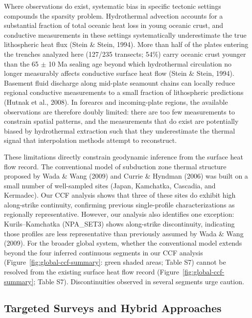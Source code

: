 \documentclass[draft,linenumbers]{agujournal2019}
\begin{document}
Where observations do exist, systematic bias in specific tectonic
settings compounds the sparsity problem. Hydrothermal advection accounts
for a substantial fraction of total oceanic heat loss in young oceanic
crust, and conductive measurements in these settings systematically
underestimate the true lithospheric heat flux (Stein \& Stein, 1994).
More than half of the plates entering the trenches analyzed here
(127/235 transects; 54\%) carry oceanic crust younger than the 65
\(\pm\) 10 Ma sealing age beyond which hydrothermal circulation no
longer measurably affects conductive surface heat flow (Stein \& Stein,
1994). Basement fluid discharge along mid-plate seamount chains can
locally reduce regional conductive measurements to a small fraction of
lithospheric predictions (Hutnak et al., 2008). In forearcs and
incoming-plate regions, the available observations are therefore doubly
limited: there are too few measurements to constrain spatial patterns,
and the measurements that do exist are potentially biased by
hydrothermal extraction such that they underestimate the thermal signal
that interpolation methods attempt to reconstruct.

These limitations directly constrain geodynamic inference from the
surface heat flow record. The conventional model of subduction zone
thermal structure proposed by Wada \& Wang (2009) and Currie \& Hyndman
(2006) was built on a small number of well-sampled sites (Japan,
Kamchatka, Cascadia, and Kermadec). Our CCF analysis shows that three of
these sites do exhibit high along-strike continuity, confirming previous
single-profile characterizations as regionally representative. However,
our analysis also identifies one exception: Kurils--Kamchatka
(NPA\_SET3) shows along-strike discontinuity, indicating those profiles
are less representative than previously assumed by Wada \& Wang (2009).
For the broader global system, whether the conventional model extends
beyond the four inferred continuous segments in our CCF analysis
(Figure~\ref{fig:global-ccf-summary}: green shaded areas; Table S7)
cannot be resolved from the existing surface heat flow record
(Figure~\ref{fig:global-ccf-summary}; Table S7). Discontinuities
observed in several segments urge caution.

\subsection{Targeted Surveys and Hybrid
Approaches}\label{sec:targeted-surveys-and-hybrid-approaches}
\end{document}
